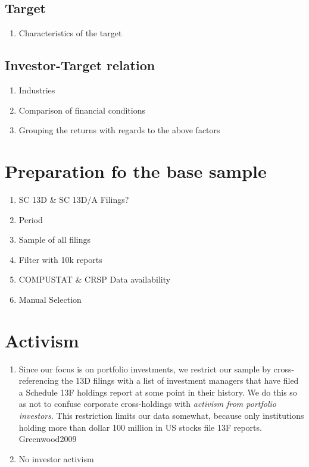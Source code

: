 \documentclass{article}
\begin{document}
  \subsection{Target}

    \begin{enumerate}

      \item Characteristics of the target 
    \end{enumerate}

  \subsection{Investor-Target relation}

    \begin{enumerate}
      \item Industries
      \item Comparison of financial conditions 
      \item Grouping the returns with regards to the above factors
    \end{enumerate}

\section{Preparation fo the base sample}

  \begin{enumerate}
    \item SC 13D \& SC 13D/A Filings? 
    \item Period
    \item Sample of all filings
    \item Filter with 10k reports 
    \item COMPUSTAT \& CRSP Data availability
    \item Manual Selection
  \end{enumerate}

\section{Activism}

  \begin{enumerate}
    \item Since our focus is on portfolio investments, we restrict our sample by cross-referencing the 13D filings with a list of investment managers that have filed a Schedule 13F holdings report at some point in their history. We do this so as not to confuse corporate cross-holdings with \emph{activism from portfolio investors}. This restriction limits our data somewhat, because only institutions holding more than dollar 100 million in US stocks file 13F reports. {Greenwood2009}
    \item No investor activism 
  \end{enumerate}
\end{document}

